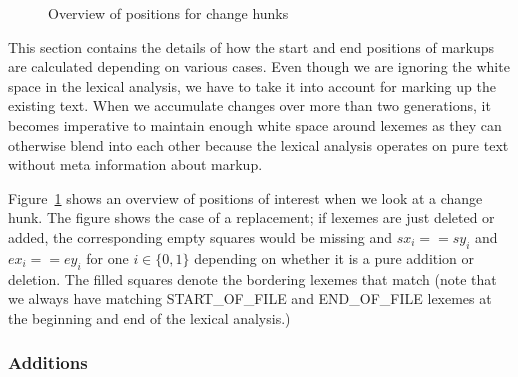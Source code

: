 \begin{figure}
\centering
{}
\caption{Overview of positions for change hunks} \label{fig:pos-overview}
\end{figure}

This section contains the details of how the start and end positions of markups are calculated depending on various cases.  Even though we are ignoring the white space in the lexical analysis, we have to take it into account for marking up the existing text.  When we accumulate changes over more than two generations, it becomes imperative to maintain enough white space around lexemes as they can otherwise blend into each other because the lexical analysis operates on pure text without meta information about markup.

Figure~\ref{fig:pos-overview} shows an overview of positions of interest when we look at a change hunk.  The figure shows the case of a replacement; if lexemes are just deleted or added, the corresponding empty squares would be missing and $sx_{i} == sy_{i}$ and $ex_{i} == ey_{i}$ for one $i \in \{0, 1\}$ depending on whether it is a pure addition or deletion.  The filled squares denote the bordering lexemes that match (note that we always have matching START\_OF\_FILE and END\_OF\_FILE lexemes at the beginning and end of the lexical analysis.)

\subsubsection{Additions}

